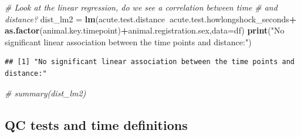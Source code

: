 \documentclass[]{article}
\newenvironment{Shaded}{\begin{snugshade}}{\end{snugshade}}
\newcommand{\KeywordTok}[1]{\textcolor[rgb]{0.13,0.29,0.53}{\textbf{#1}}}
\newcommand{\DataTypeTok}[1]{\textcolor[rgb]{0.13,0.29,0.53}{#1}}
\newcommand{\StringTok}[1]{\textcolor[rgb]{0.31,0.60,0.02}{#1}}
\newcommand{\CommentTok}[1]{\textcolor[rgb]{0.56,0.35,0.01}{\textit{#1}}}
\newcommand{\OperatorTok}[1]{\textcolor[rgb]{0.81,0.36,0.00}{\textbf{#1}}}
\newcommand{\NormalTok}[1]{#1}
\begin{document}
\begin{Shaded}
\begin{Highlighting}[]
\CommentTok{# Look at the linear regression, do we see a correlation between time}
\CommentTok{# and distance?}
\NormalTok{dist_lm2 =}\StringTok{ }\KeywordTok{lm}\NormalTok{(acute.test.distance}\OperatorTok{~}\NormalTok{acute.test.howlongshock_seconds}\OperatorTok{+}
\StringTok{                }\KeywordTok{as.factor}\NormalTok{(animal.key.timepoint)}\OperatorTok{+}\NormalTok{animal.registration.sex,}\DataTypeTok{data=}\NormalTok{df)}
\KeywordTok{print}\NormalTok{(}\StringTok{"No significant linear association between the time points and distance:"}\NormalTok{)}
\end{Highlighting}
\end{Shaded}

\begin{verbatim}
## [1] "No significant linear association between the time points and distance:"
\end{verbatim}

\begin{Shaded}
\begin{Highlighting}[]
\CommentTok{# summary(dist_lm2)}
\end{Highlighting}
\end{Shaded}

\subsection{QC tests and time
definitions}\label{qc-tests-and-time-definitions}
\end{document}
